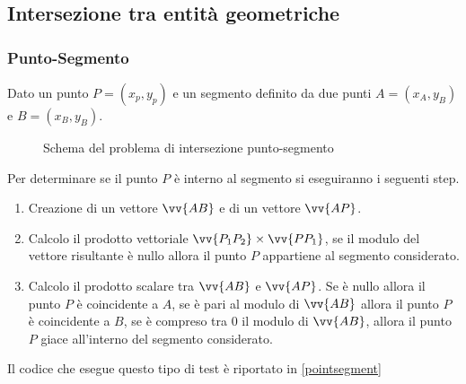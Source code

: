 \subsection{Intersezione tra entità geometriche}
%
\subsubsection{Punto-Segmento}
Dato un punto $P = (x_p, y_p)$ e un segmento definito da due punti $A = (x_A, y_B)$ e $B = (x_B, y_B)$.

\begin{figure}[h!]
	\centering
	\caption{Schema del problema di intersezione punto-segmento}
\end{figure}
\noindent
Per determinare se il punto $P$ è interno al segmento si eseguiranno i seguenti step.
\begin{enumerate}
	\item Creazione di un vettore $\vv{AB}$ e di un vettore $\vv{AP}$.
	\item Calcolo il prodotto vettoriale  $\vv{P_1P_2} \times  \vv{PP_1}$, se il modulo del vettore risultante è nullo allora il punto $P$ appartiene al segmento considerato.
	\item Calcolo il prodotto scalare tra $\vv{AB}$ e $\vv{AP}$. Se è nullo allora il punto $P$ è coincidente a $A$, se è pari al modulo di $\vv{AB}$ allora il punto $P$ è coincidente a $B$, se è compreso tra 0 il modulo di $\vv{AB}$, allora il punto $P$ giace all'interno del segmento considerato.
\end{enumerate}
Il codice che esegue questo tipo di test è riportato in \figurename{ \ref{pointsegment}}

